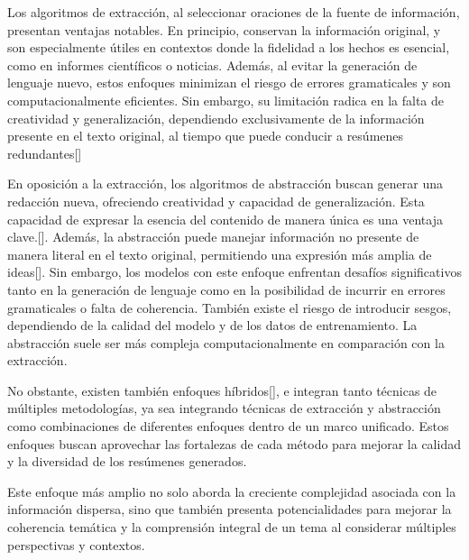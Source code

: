    Los algoritmos de extracción, al seleccionar oraciones de la fuente de información, presentan ventajas notables. En principio, conservan la información original, y son especialmente útiles en contextos donde la fidelidad a los hechos es esencial, como en informes científicos o noticias. Además, al evitar la generación de lenguaje nuevo, estos enfoques minimizan el riesgo de errores gramaticales y son computacionalmente eficientes. Sin embargo, su limitación radica en la falta de creatividad y generalización, dependiendo exclusivamente de la información presente en el texto original, al tiempo que puede conducir a resúmenes redundantes[\cite{LexRank}]

    En oposición a la extracción, los algoritmos de abstracción buscan generar una redacción nueva, ofreciendo creatividad y capacidad de generalización. Esta capacidad de expresar la esencia del contenido de manera única es una ventaja clave.[\cite{rush2015neural}]. Además, la abstracción puede manejar información no presente de manera literal en el texto original, permitiendo una expresión más amplia de ideas[\cite{PaulusXS17}]. Sin embargo, los modelos con este enfoque enfrentan desafíos significativos tanto en la generación de lenguaje como en la posibilidad de incurrir en errores gramaticales o falta de coherencia. También existe el riesgo de introducir sesgos, dependiendo de la calidad del modelo y de los datos de entrenamiento. La abstracción suele ser más compleja computacionalmente en comparación con la extracción.

    No obstante, existen también enfoques híbridos[\cite{SeeLM17}], e integran tanto técnicas de múltiples metodologías, ya sea integrando técnicas de extracción y abstracción como combinaciones de diferentes enfoques dentro de un marco unificado. Estos enfoques buscan aprovechar las fortalezas de cada método para mejorar la calidad y la diversidad de los resúmenes generados.

    Este enfoque más amplio no solo aborda la creciente complejidad asociada con la información dispersa, sino que también presenta potencialidades para mejorar la coherencia temática y la comprensión integral de un tema al considerar múltiples perspectivas y contextos.

